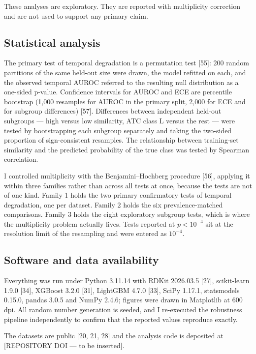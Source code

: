 These analyses are exploratory. They are reported with multiplicity correction and are not used to support any primary claim.

\subsection{Statistical analysis}

The primary test of temporal degradation is a permutation test [55]: 200 random partitions of the same held-out size were drawn, the model refitted on each, and the observed temporal AUROC referred to the resulting null distribution as a one-sided p-value. Confidence intervals for AUROC and ECE are percentile bootstrap (1,000 resamples for AUROC in the primary split, 2,000 for ECE and for subgroup differences) [57]. Differences between independent held-out subgroups --- high versus low similarity, ATC class L versus the rest --- were tested by bootstrapping each subgroup separately and taking the two-sided proportion of sign-consistent resamples. The relationship between training-set similarity and the predicted probability of the true class was tested by Spearman correlation.

I controlled multiplicity with the Benjamini--Hochberg procedure [56], applying it within three families rather than across all tests at once, because the tests are not of one kind. Family 1 holds the two primary confirmatory tests of temporal degradation, one per dataset. Family 2 holds the six prevalence-matched comparisons. Family 3 holds the eight exploratory subgroup tests, which is where the multiplicity problem actually lives. Tests reported at $p < 10^{-4}$ sit at the resolution limit of the resampling and were entered as $10^{-4}$.

\subsection{Software and data availability}

Everything was run under Python 3.11.14 with RDKit 2026.03.5 [27], scikit-learn 1.9.0 [34], XGBoost 3.2.0 [31], LightGBM 4.7.0 [33], SciPy 1.17.1, statsmodels 0.15.0, pandas 3.0.5 and NumPy 2.4.6; figures were drawn in Matplotlib at 600 dpi. All random number generation is seeded, and I re-executed the robustness pipeline independently to confirm that the reported values reproduce exactly.

The datasets are public [20, 21, 28] and the analysis code is deposited at [REPOSITORY DOI --- to be inserted].

